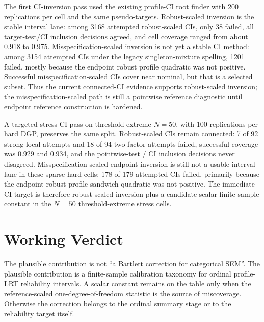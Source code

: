\documentclass[11pt]{article}
\theoremstyle{plain}
\theoremstyle{remark}
\begin{document}
The first CI-inversion pass used the existing profile-CI root finder with
200 replications per cell and the same pseudo-targets. Robust-scaled inversion
is the stable interval lane: among 3168 attempted robust-scaled CIs, only 38
failed, all target-test/CI inclusion decisions agreed, and cell coverage ranged
from about 0.918 to 0.975. Misspecification-scaled inversion is not yet a
stable CI method: among 3154 attempted CIs under the legacy singleton-mixture
spelling, 1201 failed, mostly because the endpoint robust profile quadratic was
not positive. Successful misspecification-scaled CIs cover near nominal, but
that is a selected subset. Thus the current connected-CI evidence supports
robust-scaled inversion; the misspecification-scaled path is still a pointwise
reference diagnostic until endpoint reference construction is hardened.

A targeted stress CI pass on threshold-extreme \(N=50\), with 100 replications
per hard DGP, preserves the same split. Robust-scaled CIs remain connected: 7 of
92 strong-local attempts and 18 of 94 two-factor attempts failed, successful
coverage was 0.929 and 0.934, and the pointwise-test / CI inclusion decisions
never disagreed. Misspecification-scaled endpoint inversion is still not a
usable interval lane in these sparse hard cells: 178 of 179 attempted CIs failed,
primarily because the endpoint robust profile sandwich quadratic was not
positive. The immediate CI target is therefore robust-scaled inversion plus a
candidate scalar finite-sample constant in the \(N=50\) threshold-extreme stress
cells.

\section*{Working Verdict}

The plausible contribution is not ``a Bartlett correction for categorical SEM''.
The plausible contribution is a finite-sample calibration taxonomy for ordinal
profile-LRT reliability intervals. A scalar constant remains on the table only
when the reference-scaled one-degree-of-freedom statistic is the source of
miscoverage. Otherwise the correction belongs to the ordinal summary stage or to
the reliability target itself.
\end{document}
